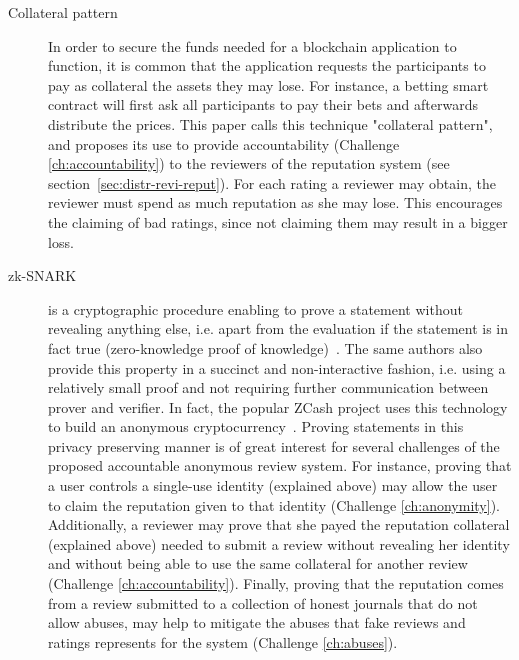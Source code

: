 \begin{description}
\item[Collateral pattern] In order to secure the funds needed for a blockchain
  application to function, it is common that the application requests the
  participants to pay as collateral the assets they may lose. For instance, a
  betting smart contract will first ask all participants to pay their bets and
  afterwards distribute the prices. This paper calls this technique "collateral
  pattern", and proposes its use to provide accountability (Challenge
  \ref{ch:accountability}) to the reviewers of the reputation system (see
  section~\ref{sec:distr-revi-reput}). For each rating a reviewer may obtain,
  the reviewer must spend as much reputation as she may lose. This encourages
  the claiming of bad ratings, since not claiming them may result in a bigger
  loss.

\item[zk-SNARK] is a cryptographic procedure enabling to prove a statement
  without revealing anything else, i.e. apart from the evaluation if the
  statement is in fact true (zero-knowledge proof of
  knowledge)~\cite{blum1988non,bitansky2013succinct}. The same authors also
  provide this property in a succinct and non-interactive fashion, i.e. using a
  relatively small proof and not requiring further communication between prover
  and verifier. In fact, the popular ZCash project uses this technology to build
  an anonymous cryptocurrency~\cite{sasson2014zerocash}. Proving statements in
  this privacy preserving manner is of great interest for several challenges of
  the proposed accountable anonymous review system. For instance, proving that a
  user controls a single-use identity (explained above) may allow the user to
  claim the reputation given to that identity (Challenge \ref{ch:anonymity}).
  Additionally, a reviewer may prove that she payed the reputation collateral
  (explained above) needed to submit a review without revealing her identity and
  without being able to use the same collateral for another review (Challenge
  \ref{ch:accountability}). Finally, proving that the reputation comes from a
  review submitted to a collection of honest journals that do not allow abuses,
  may help to mitigate the abuses that fake reviews and ratings represents for
  the system (Challenge \ref{ch:abuses}).


\end{description}
